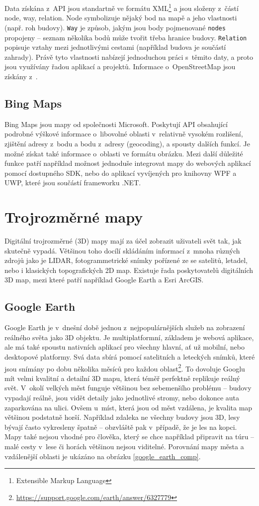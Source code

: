 Data získána z~API jsou standartně ve formátu XML\footnote{Extensible Markup Language} a jsou složeny z~částí node, way, relation. Node symbolizuje nějaký bod na mapě a jeho vlastnosti (např. roh budovy). \verb|Way| je způsob, jakým jsou body pojmenované \verb|nodes| propojeny -- seznam několika bodů může tvořit třeba hranice budovy. \verb|Relation| popisuje vztahy mezi jednotlivými cestami (například budova je součástí zahrady). Právě tyto vlastnosti nabízejí jednoduchou práci s~těmito daty, a proto jsou využívány řadou aplikací a projektů. Informace o~OpenStreetMap jsou získány z~\cite{osm}.

\subsection*{Bing Maps}
Bing Maps jsou mapy od společnosti Microsoft. Poskytují API obsahující podrobné výškové informace o~libovolné oblasti v~relativně vysokém rozlišení, zjištění adresy z~bodu a bodu z~adresy (geocoding), a spousty dalších funkcí. Je možné získat také informace o~oblasti ve formátu obrázku. Mezi další důležité funkce patří například možnost jednoduše integrovat mapy do webových aplikací pomocí dostupného SDK, nebo do aplikací vyvíjených pro knihovny WPF a UWP, které jsou součástí frameworku .NET. 


\section{Trojrozměrné mapy}
Digitální trojrozměrné (3D) mapy mají za účel zobrazit uživateli svět tak, jak skutečně vypadá. Většinou toho docílí skládáním informací z~mnoha různých zdrojů jako je LIDAR, fotogrammetrické snímky pořízené ze se satelitů, letadel, nebo i klasických topografických 2D map. Existuje řada poskytovatelů digitálních 3D map, mezi které patří například Google Earth a Esri ArcGIS.
\subsection*{Google Earth}
Google Earth je v~dnešní době jednou z~nejpopulárnějších služeb na zobrazení reálného světa jako 3D objektu. Je multiplatformní, základem je webová aplikace, ale má také spoustu nativních aplikací pro všechny hlavní, ať už mobilní, nebo desktopové platformy. Svá data sbírá pomocí satelitních a leteckých snímků, které jsou snímány po dobu několika měsíců pro každou oblast\footnote{\href{https://support.google.com/earth/answer/6327779}{https://support.google.com/earth/answer/6327779}}. To dovoluje Googlu mít velmi kvalitní a detailní 3D mapu, která téměř perfektně replikuje reálný svět. V~okolí velkých měst funguje většinou bez sebemenšího problému -- budovy vypadají reálně, jsou vidět detaily jako jednotlivé stromy, nebo dokonce auta zaparkována na ulici. Ovšem u~míst, která jsou od měst vzdálena, je kvalita map většinou podstatně horší. Například zdaleka ne všechny budovy jsou 3D, lesy bývají často vykresleny špatně -- obzvláště pak v~případě, že je les na kopci. Mapy také nejsou vhodné pro člověka, který se chce například připravit na túru -- malé cesty v~lese či horách většinou nejsou viditelné. Porovnání mapy města a vzdálenější oblasti je ukázáno na obrázku   \ref{google_earth_comp}.

